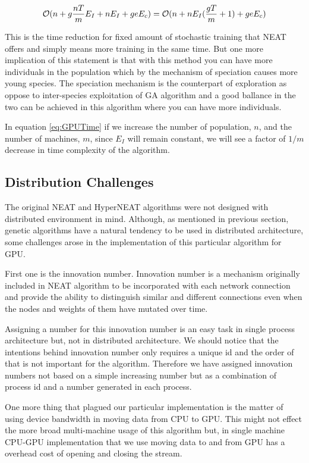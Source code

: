 \documentclass[twocolumn]{article}
\begin{document}
\begin{equation}
    \label{eq:GPUTime}
    \mathcal{O}(n+g \frac{nT}{m}E_I+nE_I+geE_c)=\\
    \mathcal{O}(n+nE_I(\frac{gT}{m}+1)+geE_c)
\end{equation}

This is the time reduction for fixed amount of stochastic training that NEAT offers and simply means more training in the same time. But one more implication of this statement is that with this method you can have more individuals in the population which by the mechanism of speciation causes more young species. The speciation mechanism is the counterpart of exploration as oppose to inter-species exploitation of GA algorithm and a good ballance in the two can be achieved in this algorithm where you can have more individuals. \cite{ExploreVsExploit}

In equation \ref{eq:GPUTime} if we increase the number of population, $n$, and the number of machines, $m$, since $E_I$ will remain constant, we will see a factor of $1/m$ decrease in time complexity of the algorithm.

\subsection{Distribution Challenges}
The original NEAT and HyperNEAT algorithms were not designed with distributed environment in mind. Although, as mentioned in previous section, genetic algorithms have a natural tendency to be used in distributed architecture, some challenges arose in the implementation of this particular algorithm for GPU.

First one is the innovation number. Innovation number is a mechanism originally included in NEAT algorithm to be incorporated with each network connection and provide the ability to distinguish similar and different connections even when the nodes and weights of them have mutated over time. \cite{originalNEAT}

Assigning a number for this innovation number is an easy task in single process architecture but, not in distributed architecture. We should notice that the intentions behind innovation number only requires a unique id and the order of that is not important for the algorithm. Therefore we have assigned innovation numbers not based on a simple increasing number but as a combination of process id and a number generated in each process.

One more thing that plagued our particular implementation is the matter of using device bandwidth in moving data from CPU to GPU. This might not effect the more broad multi-machine usage of this algorithm but, in single machine CPU-GPU implementation that we use moving data to and from GPU has a overhead cost of opening and closing the stream.
\end{document}
